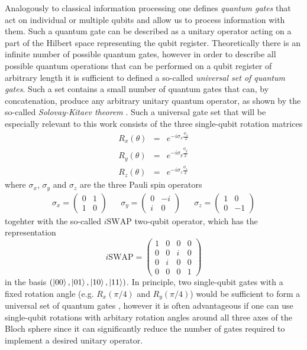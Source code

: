 Analogously to classical information processing one defines {\it quantum gates} that act on individual or multiple qubits and allow us to process information with them. Such a quantum gate can be described as a unitary operator acting on a part of the Hilbert space representing the qubit register. Theoretically there is an infinite number of possible quantum gates, however in order to describe all possible quantum operations that can be performed on a qubit register of arbitrary length it is sufficient to defined a so-called {\it universal set of quantum gates}. Such a set contains a small number of quantum gates that can, by concatenation, produce any arbitrary unitary quantum operator, as shown by the so-called {\it Solovay-Kitaev theorem} \citep{nielsen_quantum_2000,dawson_solovay-kitaev_2005}. Such a universal gate set that will be especially relevant to this work consists of the three single-qubit rotation matrices
%
\begin{eqnarray}
   R_x(\theta)  & = & e^{-i\sigma_x\frac{\phi_x}{2}} \\ 
   R_y(\theta)  & = & e^{-i\sigma_y\frac{\phi_y}{2}} \\ 
   R_z(\theta)  & = & e^{-i\sigma_z\frac{\phi_z}{2}} 
\label{eq:universal_single_qubit_gates}
\end{eqnarray}
%
where $\sigma_x$, $\sigma_y$ and $\sigma_z$ are the three Pauli spin operators
%
\begin{align}
  \sigma_x  =  \left( \begin{array}{cc} 0 & 1 \\ 1 & 0 \end{array} \right) 
  & & \sigma_y  =  \left( \begin{array}{cc} 0 & -i \\ i  &  0\end{array} \right) 
  & & \sigma_z  =  \left( \begin{array}{cc} 1 & 0 \\ 0 & -1 \end{array} \right) 
\label{eq:pauli_operators}
\end{align}
%
togehter with the so-called $i\mathrm{SWAP}$ two-qubit operator, which has the representation
%
\begin{equation}
i\mathrm{SWAP} = \left( \begin{array}{cccc} 1 & 0 & 0 & 0 \\ 0 & 0 & i & 0 \\ 0 & i & 0 & 0 \\ 0 & 0 & 0 & 1  \end{array}  \right)
\end{equation}
%
in the basis $(\left| 00 \right>,\left| 01 \right>,\left| 10 \right>,\left| 11 \right>)$. In principle, two single-qubit gates with a fixed rotation angle (e.g. $R_x(\pi/4)$ and $R_y(\pi/4)$) would be sufficient to form a universal set of quantum gates \citep{dawson_solovay-kitaev_2005}, however it is often advantageous if one can use single-qubit rotations with arbitary rotation angles around all three axes of the Bloch sphere since it can significantly reduce the number of gates required to implement a desired unitary operator.


